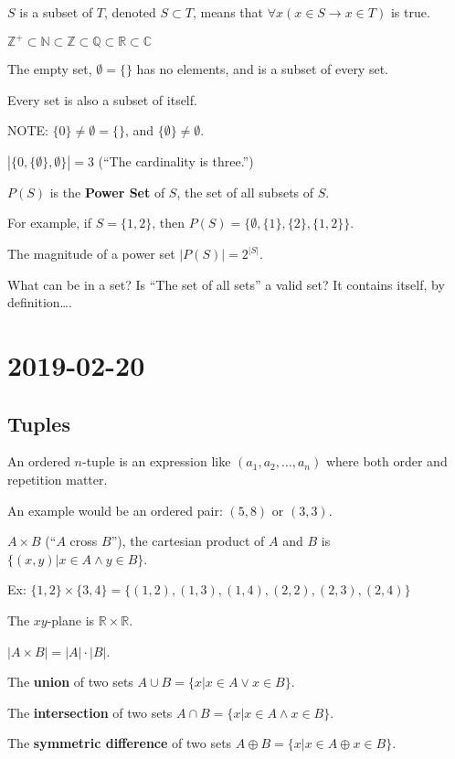 \documentclass{article}
\theoremstyle{definition}
\begin{document}
$S$ is a subset of $T$, denoted $S \subset T$, means that 
$\forall x (x \in S \to x \in T)$ is true. 

$\mathbb{Z}^+ \subset \mathbb{N} \subset \mathbb{Z} \subset
\mathbb{Q} \subset \mathbb{R} \subset \mathbb{C}$

The empty set, $\emptyset = \{\}$ has no elements, and is a subset of every set.

Every set is also a subset of itself. 

NOTE: $\{0\} \neq \emptyset = \{\}$, and $\{\emptyset\} \neq \emptyset$.

$|\{0, \{\emptyset\}, \emptyset \}| = 3$ (``The cardinality is three.'')

$P(S)$ is the \textbf{Power Set} of $S$, the set of all subsets of $S$.

For example, if $S=\{1,2\}$, then $P(S)=\{\emptyset, \{1\}, \{2\}, \{1,2\}\}$.

The magnitude of a power set $|P(S)| = 2^{|S|}$.

What can be in a set? Is ``The set of all sets'' a valid set? It contains
itself, by definition\dots.



\section*{2019-02-20}

\subsection*{Tuples}

An ordered $n$-tuple is an expression like $(a_1, a_2, \dots, a_n)$ where both
order and repetition matter.

An example would be an ordered pair: $(5,8)$ or $(3,3)$. 

$A \times B$ (``$A$ cross $B$''), the cartesian product of $A$ and $B$ is
$\{ (x,y) | x \in A \land y \in B\}$.

Ex: $\{1,2\}\times\{3,4\}=\{(1,2),(1,3),(1,4),(2,2),(2,3),(2,4)\}$

The $xy$-plane is $\mathbb{R}\times\mathbb{R}$.

$|A \times B| = |A| \cdot |B|$.

The \textbf{union} of two sets
$A \cup B = \{ x | x \in A \lor x \in B \}$.

The \textbf{intersection} of two sets
$A \cap B = \{ x | x \in A \land x \in B \}$.

The \textbf{symmetric difference} of two sets
$A \oplus B = \{ x | x \in A \oplus x \in B \}$.
\end{document}
